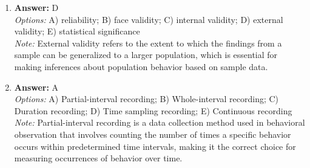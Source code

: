 \documentclass[12pt]{article}
\begin{document}
\begin{enumerate}[label=\arabic*.]
\item \textbf{Answer:} D
\\ \textit{Options:} A) reliability; B) face validity; C) internal validity; D) external validity; E) statistical significance
\\ \textit{Note:} External validity refers to the extent to which the findings from a sample can be generalized to a larger population, which is essential for making inferences about population behavior based on sample data.
\item \textbf{Answer:} A
\\ \textit{Options:} A) Partial-interval recording; B) Whole-interval recording; C) Duration recording; D) Time sampling recording; E) Continuous recording
\\ \textit{Note:} Partial-interval recording is a data collection method used in behavioral observation that involves counting the number of times a specific behavior occurs within predetermined time intervals, making it the correct choice for measuring occurrences of behavior over time.
\end{enumerate}
\end{document}
